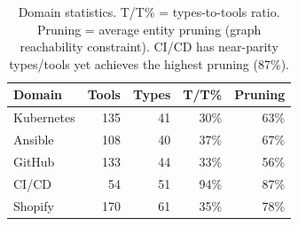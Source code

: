 \begin{table}[t]
\centering
\small
\begin{tabular}{l rrr r}
\toprule
\textbf{Domain} & \textbf{Tools} & \textbf{Types} & \textbf{T/T\%} & \textbf{Pruning} \\
\midrule
Kubernetes & 135 & 41 & 30\% & 63\% \\
Ansible & 108 & 40 & 37\% & 67\% \\
GitHub & 133 & 44 & 33\% & 56\% \\
CI/CD & 54 & 51 & 94\% & 87\% \\
Shopify & 170 & 61 & 35\% & 78\% \\
\bottomrule
\end{tabular}
\caption{Domain statistics. T/T\% = types-to-tools ratio. Pruning = average entity pruning (graph reachability constraint). CI/CD has near-parity types/tools yet achieves the highest pruning (87\%).}
\label{tab:domain-stats}
\end{table}